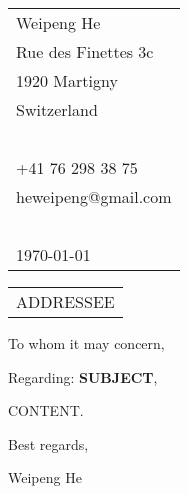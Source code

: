 \documentclass[a4paper]{article}
\begin{document}
\hfill
\begin{tabular}{l@{}}
  Weipeng He \\
  Rue des Finettes 3c\\
  1920 Martigny \\
  Switzerland \\
  ~ \\
  +41 76 298 38 75 \\
  heweipeng@gmail.com \\
  ~ \\
  \today \\
\end{tabular}
\bigskip

\begin{tabular}{@{}l}
  ADDRESSEE
\end{tabular}
\bigskip

To whom it may concern,
\bigskip

Regarding: \textbf{SUBJECT},

CONTENT.

\bigskip

Best regards,

\bigskip\bigskip\bigskip

Weipeng He
\end{document}
